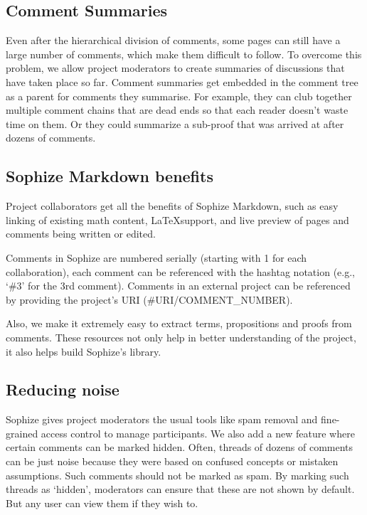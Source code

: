 \documentclass[a4paper]{article}
\begin{document}
\subsection{Comment Summaries}

Even after the hierarchical division of comments, some pages can still have a large number of comments, which make them difficult to follow. To overcome this problem, we allow project moderators to create summaries of discussions that have taken place so far. Comment summaries get embedded in the comment tree as a parent for comments they summarise. For example, they can club together multiple comment chains that are dead ends so that each reader doesn't waste time on them. Or they could summarize a sub-proof that was arrived at after dozens of comments.

\subsection{Sophize Markdown benefits}

Project collaborators get all the benefits of Sophize Markdown, such as easy linking of existing math content, \LaTeX\space support, and live preview of pages and comments being written or edited.

Comments in Sophize are numbered serially (starting with 1 for each collaboration), each comment can be referenced with the hashtag notation (e.g., `\#3' for the 3rd comment). Comments in an external project can be referenced by providing the project's URI (\#URI/COMMENT\_NUMBER).

Also, we make it extremely easy to extract terms, propositions and proofs from comments. These resources not only help in better understanding of the project, it also helps build Sophize's library.

\subsection{Reducing noise}

Sophize gives project moderators the usual tools like spam removal and fine-grained access control to manage participants. We also add a new feature where certain comments can be marked hidden. Often, threads of dozens of comments can be just noise because they were based on confused concepts or mistaken assumptions. Such comments should not be marked as spam. By marking such threads as `hidden', moderators can ensure that these are not shown by default. But any user can view them if they wish to.
\end{document}
